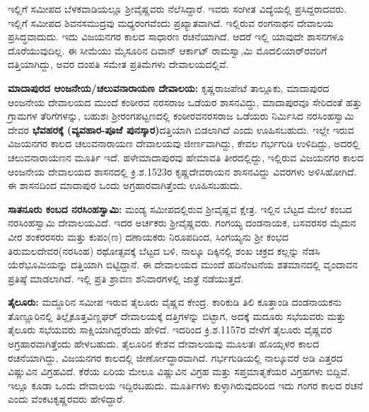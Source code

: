 \vskip 3pt

ಇಲ್ಲಿಗೆ ಸಮೀಪದ ಬೆಳಕವಾಡಿಯಲ್ಲೂ ಶ‍್ರೀವೈಷ್ಣವರು ನೆಲೆಸಿದ್ದಾರೆ. ಇವರು ಸಂಗೀತ ವಿದ್ಯೆಯಲ್ಲಿ ಪ್ರಸಿದ್ದರಾದ\-ವರು. ಇಲ್ಲಿಗೆ ಸಮೀಪದ ಶಿವನಸಮುದ್ರವು ಮಧ್ಯರಂಗವೆಂದು ಪ್ರಖ್ಯಾತವಾಗಿದೆ. ಇಲ್ಲಿರುವ ರಂಗನಾಥನ ದೇವಾಲಯ ಪ್ರಸಿದ್ಧವಾದುದು. ಇದು ವಿಜಯನಗರ ಕಾಲದ ಸಾಧಾರಣ ರಚನೆಯಾಗಿದೆ. ಆದರೆ ಇಲ್ಲಿ ಯಾವುದೇ ಶಾಸನಗಳೂ ದೊರೆಯುವುದಿಲ್ಲ. ಈ ಸೀಮೆಯು ಮೈಸೂರಿನ ದಿವಾನ್​ ಆರ್ಕಾಟ್​ ರಾಮಸ್ವಾ,ಮಿ ಮೊದಲಿಯಾರ್​ರವರಿಗೆ ದತ್ತಿಯಾಗಿದ್ದು, ಅವರ ದಂಪತಿ ಸಮೇತ ಪ್ರತಿಮೆಗಳು ದೇವಾಲಯದಲ್ಲಿವೆ.

\newpage

\textbf{ಮಾದಾಪುರದ ಆಂಜನೇಯ/ಚಲುವನಾರಾಯಣ ದೇವಾಲಯ:} ಕೃಷ್ಣರಾಜಪೇಟೆ ತಾಲ್ಲೂಕು, ಮಾದಾಪುರದ ಆಂಜನೇಯ ದೇವಾಲಯದ ಮುಂದೆ ಕಂಠೀರವ ನರಸರಾಜ ಒಡೆಯರ ಶಾಸನವಿದ್ದು, ಮಾದಾಪುರವೂ ಸೇರಿದಂತೆ ಹತ್ತು ಗ್ರಾಮಗಳ ತೆರಿಗೆಗಳನ್ನು, ಬಹುಶಃ ಶ‍್ರೀರಂಗಪಟ್ಟಣದಲ್ಲಿ ಕಂಠೀರವನರಸರಾಜ ಒಡೆಯರು ನಿರ್ಮಿಸಿದ ನರಸಿಂಹಸ್ವಾಮಿ ದೇವರ \textbf{ಭೆವಹರಕ್ಕೆ (ವ್ಯವಹಾರ-ಪೂಜೆ ಪುನಸ್ಕಾರ)}ದತ್ತಿಯಾಗಿ ಬಿಡಲಾಗಿದೆ ಎಂದು ಊಹಿಸಬಹುದು. ಇಲ್ಲೇ ಇರುವ ವಿಜಯನಗರ ಕಾಲದ ಚಲುವನಾರಾಯಣ ದೇವಾಲಯವು ಜೀರ್ಣವಾಗಿದ್ದು, ಕೇವಲ ಗರ್ಭಗುಡಿ ಉಳಿದಿದ್ದು, ಅದರಲ್ಲಿ ಚಲುವನಾರಾಯಣನ ಮೂರ್ತಿ ಇದೆ. ಹಳೇಮಾದಾಪುರವು ಹೇಮಾವತಿ ತೀರದಲ್ಲಿದ್ದು, ಇಲ್ಲಿರುವ ವಿಜಯನಗರ ಕಾಲದ ಆಂಜನೇಯ ದೇವಾಲಯದ ಶಾಸನದಲ್ಲಿ ಕ್ರಿ.ಶ.1523ರ ಕೃಷ್ಣದೇವರಾಯನ ಶಾಸನವಿದ್ದು ವಿವರಗಳು ಅಳಿಸಿಹೋಗಿದೆ. ಈ ಶಾಸನದಿಂದ ಮಾದಾಪುರ ಒಂದು ಅಗ್ರಹಾರವಾಗಿತ್ತೆಂದು ಊಹಿಸಬಹುದು.

\textbf{ಸಾತನೂರು ಕಂಬದ ನರಸಿಂಹಸ್ವಾಮಿ:} ಮಂಡ್ಯ ಸಮೀಪದಲ್ಲಿರುವ ಶ‍್ರೀವೈಷ್ಣವ ಕ್ಷೇತ್ರ. ಇಲ್ಲಿನ ಬೆಟ್ಟದ ಮೇಲೆ ಕಂಬದ ನರಸಿಂಹಸ್ವಾಮಿ ದೇವಾಲಯವಿದೆ. ಇದರ ಅರ್ಚಕರು ಶ‍್ರೀವೈಷ್ಣವರು. ಗಂಗಯ್ಯ ದಂಡನಾಯಕ, ಬಸವರಸರ ಮೈದುನ ವೀರ ಶಂಕರರಸರು ಮತ್ತು ಕುಪಂ(ಣ) ದಣಾಯಕರು ನಿರೂಪದಿಂದ, ಸಿಂಗಯ್ಯನು ಶ‍್ರೀ ಕಂಭದ ತಿರುಮಲದೇವರ(ನರಸಿಂಹ) ರಥೋತ್ಸವಕ್ಕೆ ಬೆಟ್ಟದ ಬಳಿ, ನಾಲ್ಕೂ ದಿಕ್ಕಿನಲ್ಲಿ ಶಂಖ ಚಕ್ರದ ಕಲ್ಲನ್ನು ನೆಡಸಿ ಯೆರೆಭೂಮಿಯನ್ನು ದತ್ತಿಯಾಗಿ ಬಿಟ್ಟಿದ್ದಾನೆ. ಈ ದೇವಾಲಯದ ಮುಂದೆ ಹದಿನೆಂಟನೆಯ ಶತಮಾನದಲ್ಲಿ ವೃಂದಾವನ ಪ್ರತಿಷ್ಠೆ ಮಾಡಲಾಗಿದೆ. ಇಲ್ಲಿ ಪ್ರತಿ ಶ್ರಾವಣ ಶನಿವಾರಗಳಲ್ಲಿ ಜಾತ್ರೆ ನಡೆಯುತ್ತದೆ.

\textbf{ತೈಲೂರು:} ಮದ್ದೂರಿನ ಸಮೀಪ ಇರುವ ತೈಲೂರು ವೈಷ್ಣವ ಕೇಂದ್ರ. ಕಾರಿಕುಡಿ ತಿಲಿ ಕೂತ್ತಾಂಡಿ ದಂಡನಾಯಕನು ತೊಣ್ಣೂರಿನಲ್ಲಿ ತಿಲ್ಲೈಕೂತ್ತವಿಣ್ಣಘರ್​ ದೇವಾಲಯಕ್ಕೆ ದತ್ತಿಗಳನ್ನು ಬಿಟ್ಟಾಗ, ಅದಕ್ಕೆ ಮದೂರು ಸಭೆಯವರು ಮತ್ತು ತೈಲೂರು ಸಭೆಯವರು ಸಾಕ್ಷಿಯಾಗಿದ್ದರೆಂದು ಹೇಳಿದೆ. ಇದರಿಂದ ಕ್ರಿ.ಶ.1157ರ ವೇಳೆಗೆ ತೈಲೂರು ವೈಷ್ಣವರ ಅಗ್ರಹಾರವಾಗಿತ್ತೆಂದು ಹೇಳಬಹುದು. ತೈಲೂರಿನ ಕೇಶವ ದೇವಾಲಯವು ಮೂಲತಃ ಹೊಯ್ಸಳರ ಕಾಲದ ರಚನೆಯಾಗಿದ್ದು, ವಿಜಯನಗರ ಕಾಲದಲ್ಲಿ ಜೀರ್ಣೋದ್ಧಾರವಾಗಿದೆ. ಗರ್ಭಗುಡಿಯಲ್ಲಿ ನಾಲ್ಕೂವರೆ ಅಡಿ ಎತ್ತರದ ವಿಷ್ಣುವಿನ ವಿಗ್ರಹವಿದೆ. ಕೆರೆಯ ಏರಿಯ ಮೇಲೂ ವಿಷ್ಣುವಿನ ವಿಗ್ರಹ ಮತ್ತು ಸಪ್ತಮಾತೃಕೆಯರ ವಿಗ್ರಹಗಳು ಬಿದ್ದಿವೆ. ಇಲ್ಲೂ ಕೂಡಾ ಒಂದು ದೇವಾಲಯ ಇದ್ದಿರಬಹುದು. ಮೂರ್ತಿಗಳು ಕುಳ್ಳಾಗಿರುವುದರಿಂದ ಇದು ಗಂಗರ ಕಾಲದ ರಚನೆ ಎಂದು ವೆಂಕಟಕೃಷ್ಣರವರು ಹೇಳಿದ್ದಾರೆ.


